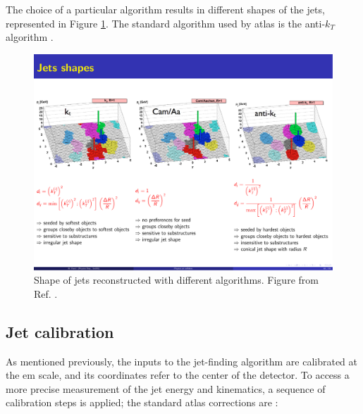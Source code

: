 The choice of a particular algorithm results in different shapes of the jets, represented in Figure \ref{fig:jetsalg}. The standard algorithm used by \gls{atlas} is the anti-$k_T$ algorithm \cite{cacciari:antikt}.

\begin{figure}[h]
\includegraphics[width=\textwidth]{./figures/objects/jetsalg.pdf}
\caption[Shape of jets reconstructed with different algorithms]{Shape of jets reconstructed with different algorithms.
Figure from Ref. \cite{cacciari:antikt}.}
\label{fig:jetsalg}
\end{figure}

\subsection{Jet calibration}
\label{sec:obj:jetcalib}

As mentioned previously, the inputs to the jet-finding algorithm are calibrated at the \gls{em} scale, and its coordinates refer to the center of the detector. To access a more precise measurement of the jet energy and kinematics, a sequence of calibration steps is applied; 
the standard \gls{atlas} corrections are \cite{PhysRevD.96.072002}:

